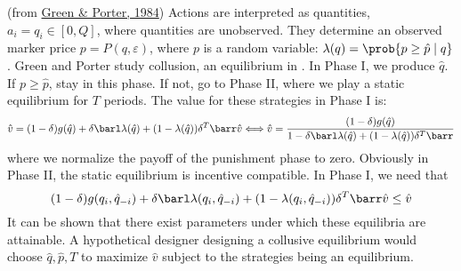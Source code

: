 \documentclass[10pt]{article}
\begin{document}
\begin{example}
	 (from \href{https://www.jstor.org/stable/1911462?seq=1}{Green \& Porter, 1984}) Actions are interpreted as quantities, $a_i = q_i \in [0,Q]$, where quantities are unobserved. They determine an observed marker price $p = P(q,\varepsilon)$, where $p$ is a random variable: $\lambda(q) = \prob\{p \ge \hat{p}\mid q\}$. Green and Porter study collusion, an equilibrium in . In Phase I, we produce $\hat{q}$. If $p \ge \hat{p}$, stay in this phase. If not, go to Phase II, where we play a static equilibrium for $T$ periods. The value for these strategies in Phase I is:
	\[
	\hat{v} = (1-\delta)g(\hat{q}) + \delta\barl \lambda(\hat{q}) + (1-\lambda(\hat{q}))\delta^T \barr\hat{v} \Longleftrightarrow \hat{v} = \frac{(1-\delta)g(\hat{q})}{1-\delta \barl \lambda(\hat{q}) + (1-\lambda(\hat{q}))\delta^T \barr}
	\]
	where we normalize the payoff of the punishment phase to zero. Obviously in Phase II, the static equilibrium is incentive compatible. In Phase I, we need that \[(1-\delta)g(q_i,\hat{q}_{-i}) + \delta \barl \lambda(q_i,\hat{q}_{-i}) + (1-\lambda(q_i,\hat{q}_{-i}))\delta^T\barr \hat{v} \le \hat{v}\]It can be shown that there exist parameters under which these equilibria are attainable. A hypothetical designer designing a collusive equilibrium would choose $\hat{q}, \hat{p}, T$ to maximize $\hat{v}$ subject to the strategies being an equilibrium.
\end{example}
\end{document}
